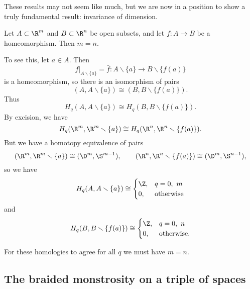 \documentclass[main.tex]{subfiles}
\begin{document}
These results may not seem like much, but we are now in a position to show a truly fundamental result: invariance of dimension.
\begin{example}
  Let \(A \subset \R^{m}\) and \(B \subset \R^{n}\) be open subsets, and let \(f\colon A \to B\) be a homeomorphism. Then \(m = n\).

  To see this, let \(a \in A\). Then
  \begin{equation*}
    \left. f \right|_{A \smallsetminus \{a\}} = \bar{f}\colon A \smallsetminus \{a\} \to B \smallsetminus \{f(a)\}
  \end{equation*}
  is a homeomorphism, so there is an isomorphism of pairs
  \begin{equation*}
    (A, A \smallsetminus \{a\}) \cong (B, B \smallsetminus \{f(a)\}).
  \end{equation*}
  Thus
  \begin{equation*}
    H_{q}(A, A \smallsetminus \{a\}) \cong H_{q}(B, B \smallsetminus \{f(a)\}).
  \end{equation*}
  By excision, we have
  \begin{equation*}
    H_{q}(\R^{m}, \R^{m} \smallsetminus \{a\}) \cong H_{q}(\R^{n}, \R^{n} \smallsetminus \{f(a)\}).
  \end{equation*}
  But we have a homotopy equivalence of pairs
  \begin{equation*}
    (\R^{m}, \R^{m} \smallsetminus \{a\}) \cong (\D^{m}, \S^{m-1}),\qquad (\R^{n}, \R^{n} \smallsetminus \{f(a)\}) \cong (\D^{m}, \S^{n-1}),
  \end{equation*}
  so we have
  \begin{equation*}
    H_{q}(A, A \smallsetminus \{a\}) \cong
    \begin{cases}
      \Z, & q = 0,\ m \\
      0, &\text{otherwise}
    \end{cases}
  \end{equation*}
  and
  \begin{equation*}
    H_{q}(B, B \smallsetminus \{f(a)\}) \cong
    \begin{cases}
      \Z, & q = 0,\ n \\
      0, &\text{otherwise}.
    \end{cases}
  \end{equation*}

  For these homologies to agree for all \(q\) we must have \(m = n\).
\end{example}


\subsection{The braided monstrosity on a triple of spaces}
\label{ssc:the_braided_monstrosity_on_a_triple_of_spaces}
\end{document}
